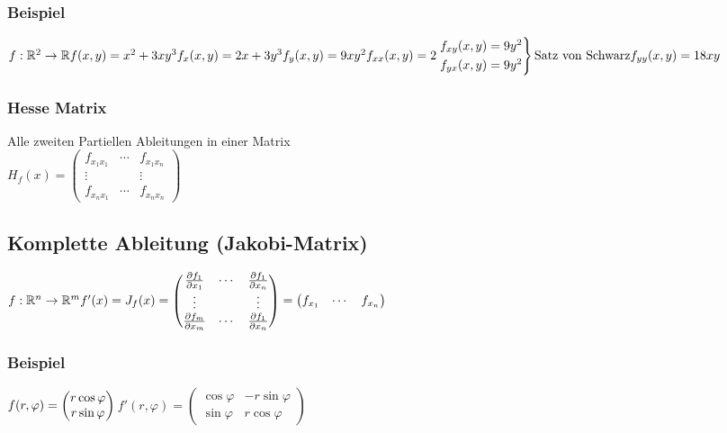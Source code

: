 \documentclass[a4paper,portrait]{scrartcl}
\begin{document}
\subsubsection*{Beispiel}
$f: \mathbb{R}^2 \rightarrow \mathbb{R} \\
f(x,y) = x^2 + 3xy^3 \\
f_x(x,y) = 2x + 3y^3 \\
f_y(x,y) = 9xy^2 \\ \\
f_{xx}(x,y) = 2\\
\begin{rcases*}
	f_{xy}(x,y) = 9y^2 \\
	f_{yx}(x,y) = 9y^2 
\end{rcases*}
\text{Satz von Schwarz}\\
f_{yy}(x,y) = 18xy$
\subsubsection{Hesse Matrix}
Alle zweiten Partiellen Ableitungen in einer Matrix \\
$H_f(x) = 
\begin{pmatrix}
	f_{x_1x_1} & \cdots & f_{x_1x_n}   \\
	\vdots &  & \vdots  \\
	f_{x_nx_1} & \cdots & f_{x_nx_n} 
\end{pmatrix}
$
\subsection{Komplette Ableitung (Jakobi-Matrix)}
$ f: \mathbb{R}^n \rightarrow \mathbb{R}^m \\
f'(x) = J_f(x) =
\begin{pmatrix}
	\frac{\partial f_1}{\partial x_1} & \cdots & \frac{\partial f_1}{\partial x_n}  \\
	\vdots &  & \vdots  \\
	\frac{\partial f_m}{\partial x_m} & \cdots & \frac{\partial f_1}{\partial x_n} 
\end{pmatrix} =
\begin{pmatrix}
	f_{x_1} & \cdots & f_{x_n}
\end{pmatrix}
$
\subsubsection{Beispiel}
$ f(r,\varphi) =
\begin{pmatrix}
	r \cos \varphi \\
	r \sin \varphi
\end{pmatrix} \\
$$
f'(r, \varphi) =
\begin{pmatrix}
	\cos \varphi & -r \sin \varphi\\
	\sin \varphi & r \cos \varphi
\end{pmatrix}
$
\end{document}
